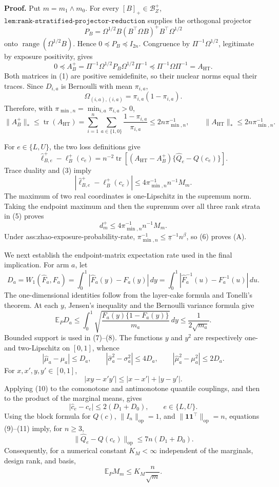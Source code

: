 \textbf{Proof.}
Put \(m=m_1\wedge m_0\).  For every \([B]_+\in\mathcal B_Z^+\), \(\texttt{lem:rank-stratified-projector-reduction}\) supplies the orthogonal projector
\[
P_B=\Omega^{1/2}B(B^{\top}\Omega B)^+B^{\top}\Omega^{1/2}
\]
onto \(\operatorname{range}(\Omega^{1/2}B)\).  Hence \(0\preceq P_B\preceq I_{2n}\).  Congruence by \(\Pi^{-1}\Omega^{1/2}\), legitimate by exposure positivity, gives
\[
0\preceq
A_B^+=\Pi^{-1}\Omega^{1/2}P_B\Omega^{1/2}\Pi^{-1}
\preceq
\Pi^{-1}\Omega\Pi^{-1}=A_{\mathrm{HT}}.
\tag{1}
\]
Both matrices in (1) are positive semidefinite, so their nuclear norms equal their traces.  Since \(D_{i,a}\) is Bernoulli with mean \(\pi_{i,a}\),
\[
\Omega_{(i,a),(i,a)}=\pi_{i,a}(1-\pi_{i,a}).
\tag{2}
\]
Therefore, with \(\pi_{\min,n}=\min_{i,a}\pi_{i,a}>0\),
\[
\lVert A_B^+\rVert_*
\le\operatorname{tr}(A_{\mathrm{HT}})
=\sum_{i=1}^n\sum_{a\in\{1,0\}}
\frac{1-\pi_{i,a}}{\pi_{i,a}}
\le2n\pi_{\min,n}^{-1},
\qquad
\lVert A_{\mathrm{HT}}\rVert_*
\le2n\pi_{\min,n}^{-1}.
\tag{3}
\]

For \(e\in\{L,U\}\), the two loss definitions give
\[
\widehat\ell_{B,e}^+-\ell_B^+(c_e)
=n^{-2}\operatorname{tr}\!\left[
(A_{\mathrm{HT}}-A_B^+)\{\widehat Q_e-Q(c_e)\}
\right].
\tag{4}
\]
Trace duality and (3) imply
\[
\left|\widehat\ell_{B,e}^+-\ell_B^+(c_e)\right|
\le4\pi_{\min,n}^{-1}n^{-1}M_m.
\tag{5}
\]
The maximum of two real coordinates is one-Lipschitz in the supremum norm.  Taking the endpoint maximum and then the supremum over all three rank strata in (5) proves
\[
d_m^+\le4\pi_{\min,n}^{-1}n^{-1}M_m.
\tag{6}
\]
Under ass:zhao-exposure-probability-rate,
\(\pi_{\min,n}^{-1}\le\underline\pi^{-1}n^\beta\), so (6) proves (A).

We next establish the endpoint-matrix expectation rate used in the final implication.  For arm \(a\), let
\[
D_a=W_1(\widehat F_a,F_a)
=\int_0^1|\widehat F_a(y)-F_a(y)|\,dy
=\int_0^1|\widehat F_a^{-1}(u)-F_a^{-1}(u)|\,du.
\tag{7}
\]
The one-dimensional identities follow from the layer-cake formula and Tonelli's theorem.  At each \(y\), Jensen's inequality and the Bernoulli variance formula give
\[
\mathbb E_P D_a
\le\int_0^1\sqrt{\frac{F_a(y)\{1-F_a(y)\}}{m_a}}\,dy
\le\frac{1}{2\sqrt{m_a}}.
\tag{8}
\]
Bounded support is used in (7)--(8).  The functions \(y\) and \(y^2\) are respectively one- and two-Lipschitz on \([0,1]\), whence
\[
|\widehat\mu_a-\mu_a|\le D_a,
\qquad
|\widehat\sigma_a^2-\sigma_a^2|\le4D_a,
\qquad
|\widehat\mu_a^2-\mu_a^2|\le2D_a.
\tag{9}
\]
For \(x,x',y,y'\in[0,1]\),
\[
|xy-x'y'|\le|x-x'|+|y-y'|.
\tag{10}
\]
Applying (10) to the comonotone and antimonotone quantile couplings, and then to the product of the marginal means, gives
\[
|\widehat c_e-c_e|\le2(D_1+D_0),
\qquad e\in\{L,U\}.
\tag{11}
\]
Using the block formula for \(Q(c)\), \(\lVert I_n\rVert_{\mathrm{op}}=1\), and \(\lVert\mathbf1\mathbf1^{\top}\rVert_{\mathrm{op}}=n\), equations (9)--(11) imply, for \(n\ge3\),
\[
\lVert\widehat Q_e-Q(c_e)\rVert_{\mathrm{op}}
\le7n(D_1+D_0).
\tag{12}
\]
Consequently, for a numerical constant \(K_M<\infty\) independent of the marginals, design rank, and basis,
\[
\mathbb E_PM_m\le K_M\frac{n}{\sqrt m}.
\tag{13}
\]

